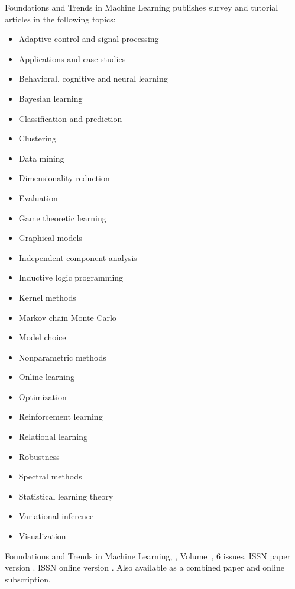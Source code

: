 


\journalaimsandscope
 {%
  Foundations and Trends\textsuperscript{\textregistered} in
Machine Learning publishes
 survey and tutorial articles in the following topics:
 \begin{multicols}{2}\raggedcolumns
 \begin{itemize}
\item{Adaptive control and signal processing}
\item{Applications and case studies}
\item{Behavioral, cognitive and neural learning}
\item{Bayesian learning}
\item{Classification and prediction}
\item{Clustering}
\item{Data mining}
\item{Dimensionality reduction}
\item{Evaluation}
\item{Game theoretic learning}
\item{Graphical models}
\item{Independent component analysis}
\item{Inductive logic programming}
\item{Kernel methods}
\item{Markov chain Monte Carlo}
\item{Model choice}
\item{Nonparametric methods}
\item{Online learning}
\item{Optimization}
\item{Reinforcement learning}
\item{Relational learning}
\item{Robustness}
\item{Spectral methods}
\item{Statistical learning theory}
\item{Variational inference}
\item{Visualization}
\end{itemize}
\end{multicols}
 }


\journallibraryinfo
 {%
  Foundations and Trends\textsuperscript{\textregistered} in
  Machine Learning, ,
  Volume~, 6 issues.
  ISSN paper version .
  ISSN online version .
  Also available as a combined paper and online
  subscription.
 } 